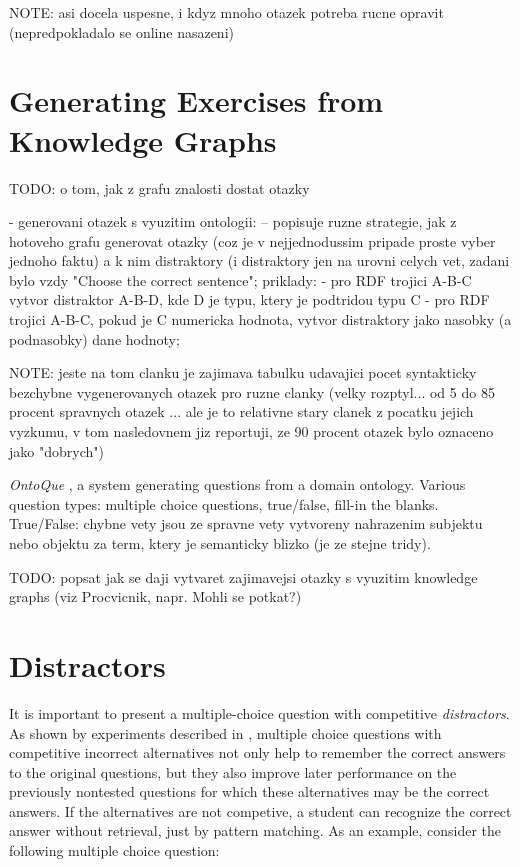 \documentclass[a4paper, 12pt, twoside]{fithesis2}		%
\renewcommand{\_}{\leavevmode \kern0.07em\vbox{\hrule width0.4em}}
\newcounter{choice}
\begin{document}
NOTE: asi docela uspesne, i kdyz mnoho otazek potreba rucne opravit (nepredpokladalo se online nasazeni)



\section{Generating Exercises from Knowledge Graphs}
\label{sec:gen-exrc-from-kg}

TODO: o tom, jak z grafu znalosti dostat otazky


- generovani otazek s vyuzitim ontologii:
\cite{question-gen-domain-ontologies} -- popisuje ruzne strategie, jak z hotoveho grafu generovat otazky (coz je v nejjednodussim pripade proste vyber jednoho faktu) a k nim distraktory (i distraktory jen na urovni celych vet, zadani bylo vzdy "Choose the correct sentence"; priklady:
- pro RDF trojici A-B-C vytvor distraktor A-B-D, kde D je typu, ktery je podtridou typu C
- pro RDF trojici A-B-C, pokud je C numericka hodnota, vytvor distraktory jako nasobky (a podnasobky) dane hodnoty;

NOTE: jeste na tom clanku je zajimava tabulku udavajici pocet syntakticky bezchybne vygenerovanych otazek pro ruzne clanky (velky rozptyl... od 5 do 85 procent spravnych otazek ... ale je to relativne stary clanek z pocatku jejich vyzkumu, v tom nasledovnem jiz reportuji, ze 90 procent otazek bylo oznaceno jako "dobrych")

\textit{OntoQue} \cite{ontoque}, a system generating questions from a domain ontology.
Various question types: multiple choice questions, true/false, fill-in the blanks.
True/False: chybne vety jsou ze spravne vety vytvoreny nahrazenim subjektu nebo objektu za term, ktery je semanticky blizko (je ze stejne tridy).


TODO: popsat jak se daji vytvaret zajimavejsi otazky s vyuzitim knowledge graphs (viz Procvicnik, napr. Mohli se potkat?)


\section{Distractors}
\label{sec:distractors}

It is important to present a multiple-choice question with competitive \textit{distractors}.
As shown by experiments described in \cite{optimizing-multiple-choice}, multiple choice questions with competitive incorrect alternatives not only help to remember the correct answers to the original questions, but they also improve later performance on the previously nontested questions for which these alternatives may be the correct answers. If the alternatives are not competive, a student can recognize the correct answer without retrieval, just by pattern matching. As an example, consider the following multiple choice question:
\end{document}
